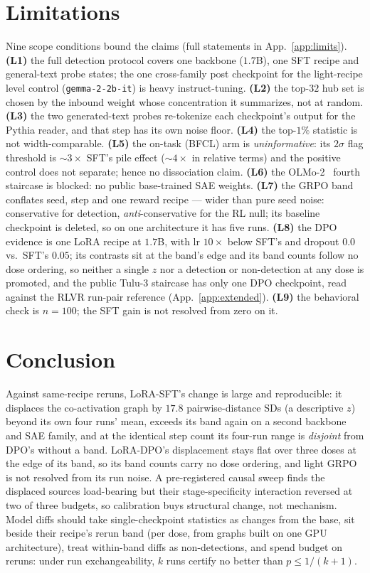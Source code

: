 \documentclass{article}
\begin{document}
\section{Limitations}
\label{sec:limitations}
Nine scope conditions bound the claims (full statements in App.~\ref{app:limits}). \textbf{(L1)} the full detection protocol covers one backbone ($1.7$B), one SFT recipe and general-text probe states; the one cross-family post checkpoint for the light-recipe level control (\texttt{gemma-2-2b-it}) is heavy instruct-tuning. \textbf{(L2)} the top-$32$ hub set is chosen by the inbound weight whose concentration it summarizes, not at random. \textbf{(L3)} the two generated-text probes re-tokenize each checkpoint's output for the Pythia reader, and that step has its own noise floor. \textbf{(L4)} the top-$1\%$ statistic is not width-comparable. \textbf{(L5)} the on-task (BFCL) arm is \emph{uninformative}: its $2\sigma$ flag threshold is ${\sim}3\times$ SFT's pile effect (${\sim}4\times$ in relative terms) and the positive control does not separate; hence no dissociation claim. \textbf{(L6)} the OLMo-2~\citep{olmo2025olmo2} fourth staircase is blocked: no public base-trained SAE weights. \textbf{(L7)} the GRPO band conflates seed, step and one reward recipe --- wider than pure seed noise: conservative for detection, \emph{anti}-conservative for the RL null; its baseline checkpoint is deleted, so on one architecture it has five runs. \textbf{(L8)} the DPO evidence is one LoRA recipe at $1.7$B, with lr $10\times$ below SFT's and dropout $0.0$ vs.\ SFT's $0.05$; its contrasts sit at the band's edge and its band counts follow no dose ordering, so neither a single $z$ nor a detection or non-detection at any dose is promoted, and the public Tulu-3 staircase has only one DPO checkpoint, read against the RLVR run-pair reference (App.~\ref{app:extended}). \textbf{(L9)} the behavioral check is $n{=}100$; the SFT gain is not resolved from zero on it.

\section{Conclusion}
Against same-recipe reruns, LoRA-SFT's change is large and reproducible: it displaces the co-activation graph by $17.8$ pairwise-distance SDs (a descriptive $z$) beyond its own four runs' mean, exceeds its band again on a second backbone and SAE family, and at the identical step count its four-run range is \emph{disjoint} from DPO's without a band. LoRA-DPO's displacement stays flat over three doses at the edge of its band, so its band counts carry no dose ordering, and light GRPO is not resolved from its run noise. A pre-registered causal sweep finds the displaced sources load-bearing but their stage-specificity interaction reversed at two of three budgets, so calibration buys structural change, not mechanism. Model diffs should take single-checkpoint statistics as changes from the base, sit beside their recipe's rerun band (per dose, from graphs built on one GPU architecture), treat within-band diffs as non-detections, and spend budget on reruns: under run exchangeability, $k$ runs certify no better than $p\le1/(k+1)$.
\end{document}
